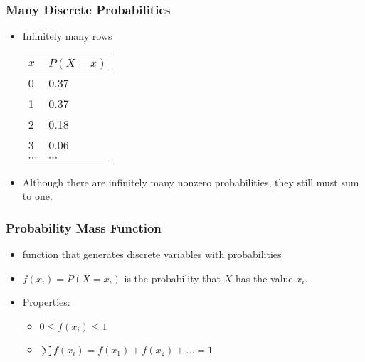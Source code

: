 \begin{frame}
\frametitle{Many Discrete Probabilities}

\begin{itemize}
\item Infinitely many
rows

\begin{center}
\begin{tabular}{ll}
{$x$} & {$P(X=x)$}\\\hline 
0 & \hspace{0.8cm}0.37\\
1 & \hspace{0.8cm}0.37\\
2 & \hspace{0.8cm}0.18\\
3 & \hspace{0.8cm}0.06\\
$\cdots$ & \hspace{0.8cm}$\cdots$
\end{tabular}
\end{center}
\item 
Although there are infinitely many nonzero probabilities, they still
must sum to one.
\end{itemize}
\end{frame}
%
%
%

\begin{frame}
\frametitle{Probability Mass Function }

\begin{itemize}
\item function that generates discrete variables with probabilities
\item $f(x_i) = P(X=x_i)$ is the probability that $X$ has the value $x_i$.
\item Properties:
\begin{itemize}
\item $0\leq f(x_i)\leq1 $
\item $\sum f(x_i) =f(x_1) +f(x_2) + \ldots = 1$ 
\end{itemize}
\end{itemize}
\end{frame}

